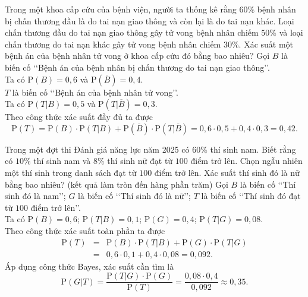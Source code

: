\begin{bt}%
	Trong một khoa cấp cứu của bệnh viện, người ta thống kê rằng $60\%$ bệnh nhân bị chấn thương đầu là do tai nạn giao thông và còn lại là do tai nạn khác. Loại chấn thương đầu do tai nạn giao thông gây tử vong bệnh nhân chiếm $50\%$ và loại chấn thương do tai nạn khác gây tử vong bệnh nhân chiếm $30\%$. Xác suất một bệnh án của bệnh nhân tử vong ở khoa cấp cứu đó bằng bao nhiêu? 
	\loigiai
	{
		Gọi $B$ là biến cố \lq\lq Bệnh án của bệnh nhân bị chấn thương do tai nạn giao thông\rq\rq.\\ Ta có $\mathrm{P}(B)=0{,}6$ và $\mathrm{P}\left(\overline{B}\right)= 0{,}4$.\\
		$T$ là biến cố \lq\lq Bệnh án của bệnh nhân tử vong\rq\rq.\\ Ta có $\mathrm{P}(T|B)= 0{,}5$ và $\mathrm{P}\left(T|\overline{B}\right)= 0{,}3$.\\
		Theo công thức xác suất đầy đủ ta được
		\[
		\mathrm{P}(T)= \mathrm{P}(B) \cdot \mathrm{P}(T|B) + \mathrm{P}\left(\overline{B}\right) \cdot \mathrm{P}\left(T|\overline{B}\right)= 0{,}6 \cdot 0{,}5 + 0{,}4 \cdot 0{,}3= 0{,}42.
		\]
	}
\end{bt}

\begin{bt}%
	Trong một đợt thi Đánh giá năng lực năm 2025 có $60\%$ thí sinh nam. Biết rằng có $10\%$ thí sinh nam và $8\%$ thí sinh nữ đạt từ $100$ điểm trở lên. Chọn ngẫu nhiên một thí sinh trong danh sách đạt từ $100$ điểm trở lên. Xác suất thí sinh đó là nữ bằng bao nhiêu? (kết quả làm tròn đến hàng phần trăm)
	\loigiai
	{
		Gọi $B$ là biến cố \lq\lq Thí sinh đó là nam\rq\rq; $G$ là biến cố \lq\lq Thí sinh đó là nữ\rq\rq; $T$ là biến cố \lq\lq Thí sinh đó đạt từ $100$ điểm trở lên\rq\rq.\\
		Ta có $\mathrm{P}(B)=0{,}6$; $\mathrm{P}(T|B)= 0{,}1$; $\mathrm{P}(G)=0{,}4$; $\mathrm{P}(T|G)=0{,}08$.\\
		Theo công thức xác suất toàn phần ta được
		\begin{eqnarray*}
			\mathrm{P}(T) &=& \mathrm{P}(B) \cdot \mathrm{P}(T|B)+ \mathrm{P}(G)\cdot \mathrm{P}(T|G)\\
			&=& 0{,}6 \cdot 0{,}1 + 0{,}4 \cdot 0{,}08= 0{,}092.
		\end{eqnarray*}
		Áp dụng công thức Bayes, xác suất cần tìm là
				\[
		\mathrm{P}(G|T)= \dfrac{\mathrm{P}(T|G)\cdot \mathrm{P}(G)}{\mathrm{P}(T)}= \dfrac{0{,}08 \cdot 0{,}4}{0{,}092} \approx 0{,}35. 
		\]
	}
\end{bt}

